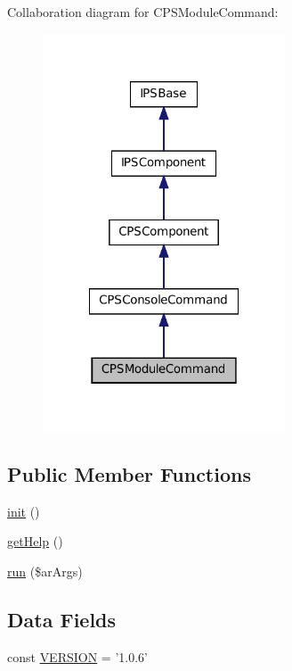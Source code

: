 Collaboration diagram for CPSModuleCommand:\nopagebreak
\begin{figure}[H]
\begin{center}
\leavevmode
\includegraphics[width=204pt]{classCPSModuleCommand__coll__graph}
\end{center}
\end{figure}
\subsection*{Public Member Functions}
\begin{DoxyCompactItemize}
\item 
\hyperlink{classCPSModuleCommand_a4be4055f3361d4800e16bc2e2e38cda6}{init} ()
\item 
\hyperlink{classCPSModuleCommand_a4cc928ef4def3a84c181608d31bf7608}{getHelp} ()
\item 
\hyperlink{classCPSModuleCommand_a330e31e8c3572ce01a4e1c8485c6aedd}{run} (\$arArgs)
\end{DoxyCompactItemize}
\subsection*{Data Fields}
\begin{DoxyCompactItemize}
\item 
const \hyperlink{classCPSModuleCommand_af71005841ce53adac00581ab0ba24c1f}{VERSION} = '1.0.6'
\end{DoxyCompactItemize}


